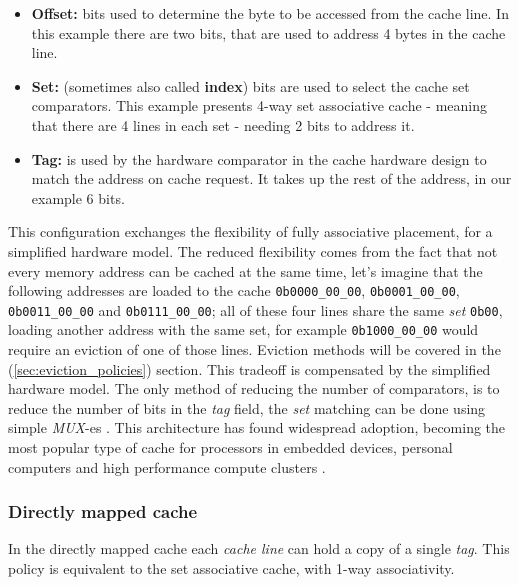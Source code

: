 \begin{itemize}
	\item \textbf{Offset:} bits used to determine the byte to be accessed from the cache line. In this example there are two bits, that are used to address 4 bytes in the cache line.
	\item \textbf{Set:} (sometimes also called \textbf{index}) bits are used to select the cache set comparators. This example presents 4-way set associative cache - meaning that there are 4 lines
		in each set - needing 2 bits to address it.
	\item \textbf{Tag:} is used by the hardware comparator in the cache hardware design to match the address on cache request. It takes up the rest of the address, in our example 6 bits.
\end{itemize}

\noindent This configuration exchanges the flexibility of fully associative placement, for a simplified hardware model. The reduced flexibility comes from the fact that
not every memory address can be cached at the same time, let's imagine that the following addresses are loaded to the cache \texttt{0b0000\_00\_00}, \texttt{0b0001\_00\_00}, \texttt{0b0011\_00\_00}
and \texttt{0b0111\_00\_00}; all of these four lines share the same \textit{set} \texttt{0b00}, loading another address with the same set, for example \texttt{0b1000\_00\_00} would require 
an eviction of one of those lines. Eviction methods will be covered in the (\ref{sec:eviction_policies}) section. 
This tradeoff is compensated by the simplified hardware model. The only method of reducing the number of comparators, is to reduce the number of bits in the \textit{tag} field, the \textit{set}
matching can be done using simple \textit{MUX}-es \cite{whatevery}. %
This architecture has found widespread adoption, becoming the most popular type of cache for processors in embedded devices, personal computers and high performance compute clusters
\cite{digitaldesgnandcomp} \cite{evalofcaceh}.

\subsubsection{Directly mapped cache}
In the directly mapped cache each \textit{cache line} can hold a copy of a single \textit{tag}. This policy is equivalent to the set associative cache, with 1-way associativity.

